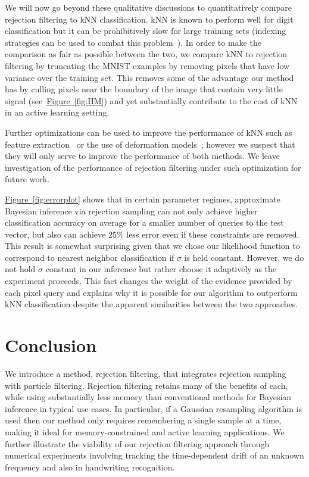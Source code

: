 \documentclass[twoside]{article}
\newcommand{\fig}[1]{\hyperref[fig:#1]{Figure~\ref*{fig:#1}}}
\begin{document}
We will now go beyond these qualitative discussions to quantitatively compare rejection filtering to kNN classification.  kNN is known to perform well for digit classification but it can be prohibitively slow for
large training sets (indexing strategies can be used to combat this problem~\cite{yu2001indexing}).  In order to make the comparison as fair as possible between the two, we compare kNN to rejection filtering by truncating the 
MNIST examples by removing pixels that have low variance over the training set.  This removes some of the advantage our method has by culling pixels near
the boundary of the image that contain very little signal  (see~\fig{HM}) and yet substantially contribute to the cost of kNN in an active learning setting.

Further optimizations can be used to improve the performance of kNN such as feature extraction~\cite{zhang2006svm,weinberger2008fast,min2009deep} or the use of 
deformation models~\cite{keysers2007deformation};
however we suspect that they will only serve to improve the performance of both methods. We leave investigation of the performance of rejection filtering under such optimization
for future work.

\fig{errorplot} shows that in certain parameter regimes, approximate Bayesian inference via rejection sampling can not only achieve higher classification accuracy on average for a smaller
number of queries to the test vector, but also can achieve $25\%$ less error even if these constraints are removed.  This result is somewhat surprising given that we chose our likelihood function to correspond to nearest neighbor classification if $\sigma$ is held constant.  However, we do not hold $\sigma$ constant in our inference but rather choose it adaptively as the experiment proceeds.  This fact changes the weight of the evidence provided by each pixel query and explains why it is possible for our algorithm to outperform kNN classification despite the apparent similarities between the two approaches.

\section{Conclusion}
\label{sec:conclusions}

We introduce a method, rejection filtering, that integrates
rejection sampling with particle filtering. Rejection filtering retains many of the benefits
of each, while using substantially less memory than conventional methods for Bayesian inference in typical use cases.
In particular, if a Gaussian resampling algorithm is used then our method only requires remembering a single sample at a time, making it ideal
for memory-constrained and active learning applications.
We further illustrate the viability of our rejection filtering approach through numerical experiments
involving tracking the time-dependent drift of an unknown frequency and also in handwriting recognition.
\end{document}
